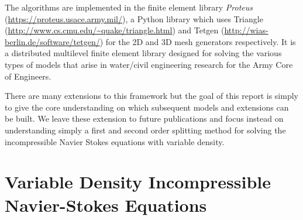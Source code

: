 \documentclass[letterpaper]{erdc}
\begin{document}
The algorithms are implemented in the finite element library \textit{Proteus}
(\url{https://proteus.usace.army.mil/}), a Python library which uses Triangle
(\url{http://www.cs.cmu.edu/~quake/triangle.html}) and Tetgen
(\url{http://wias-berlin.de/software/tetgen/}) for the 2D and 3D mesh
generators respectively.  It is a distributed multilevel finite element library
designed for solving the various types of models that arise in water/civil
engineering research for the Army Core of Engineers.

There are many extensions to this framework but the goal of this report is
simply to give the core understanding on which subsequent models and extensions
can be built.  We leave these extension to future publications and focus
instead on understanding simply a first and second order splitting method for
solving the incompressible Navier Stokes equations with variable density.


%
%
%
%
\chapter{Variable Density Incompressible Navier-Stokes Equations}
\label{ch:vardensity_NavierStokes_description}
\end{document}
